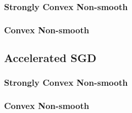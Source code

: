 \subsubsection{Strongly Convex Non-smooth}
\label{sec:sgdscvxnonsmth}

\subsubsection{Convex Non-smooth}
\label{sec:sgdcvxnonsmth}


\subsection{Accelerated SGD}
\subsubsection{Strongly Convex Non-smooth}
\label{sec:nasgdscvxnonsmth}

\subsubsection{Convex Non-smooth}
\label{sec:nasgdcvxnonsmth}





